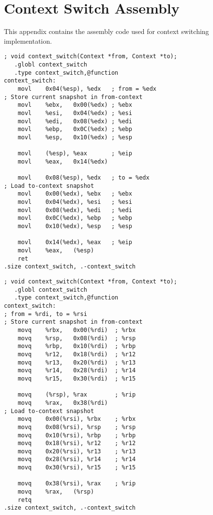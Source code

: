 
\chapter{Context Switch Assembly}
\label{ch:assembly}

This appendix contains the assembly code used for context switching implementation.

\begin{lstlisting}[style={CustomAsm},caption={Context switch assembly for i386}]
; void context_switch(Context *from, Context *to);
   .globl context_switch          
   .type context_switch,@function 
context_switch:
    movl    0x04(%esp), %edx   ; from = %edx
; Store current snapshot in from-context
    movl    %ebx,   0x00(%edx) ; %ebx
    movl    %esi,   0x04(%edx) ; %esi
    movl    %edi,   0x08(%edx) ; %edi
    movl    %ebp,   0x0C(%edx) ; %ebp
    movl    %esp,   0x10(%edx) ; %esp

    movl    (%esp), %eax       ; %eip
    movl    %eax,   0x14(%edx) 

    movl    0x08(%esp), %edx   ; to = %edx
; Load to-context snapshot
    movl    0x00(%edx), %ebx   ; %ebx
    movl    0x04(%edx), %esi   ; %esi
    movl    0x08(%edx), %edi   ; %edi
    movl    0x0C(%edx), %ebp   ; %ebp
    movl    0x10(%edx), %esp   ; %esp

    movl    0x14(%edx), %eax   ; %eip
    movl    %eax,   (%esp)
    ret
.size context_switch, .-context_switch
\end{lstlisting}

\begin{lstlisting}[style={CustomAsm},caption={Context switch assembly for x86\_64}]
; void context_switch(Context *from, Context *to);
   .globl context_switch          
   .type context_switch,@function 
context_switch:
; from = %rdi, to = %rsi
; Store current snapshot in from-context
    movq    %rbx,   0x00(%rdi)  ; %rbx
    movq    %rsp,   0x08(%rdi)  ; %rsp
    movq    %rbp,   0x10(%rdi)  ; %rbp
    movq    %r12,   0x18(%rdi)  ; %r12
    movq    %r13,   0x20(%rdi)  ; %r13
    movq    %r14,   0x28(%rdi)  ; %r14
    movq    %r15,   0x30(%rdi)  ; %r15

    movq    (%rsp), %rax        ; %rip
    movq    %rax,   0x38(%rdi)
; Load to-context snapshot
    movq    0x00(%rsi), %rbx    ; %rbx
    movq    0x08(%rsi), %rsp    ; %rsp
    movq    0x10(%rsi), %rbp    ; %rbp
    movq    0x18(%rsi), %r12    ; %r12
    movq    0x20(%rsi), %r13    ; %r13
    movq    0x28(%rsi), %r14    ; %r14
    movq    0x30(%rsi), %r15    ; %r15

    movq    0x38(%rsi), %rax    ; %rip
    movq    %rax,   (%rsp)
    retq
.size context_switch, .-context_switch
\end{lstlisting}

